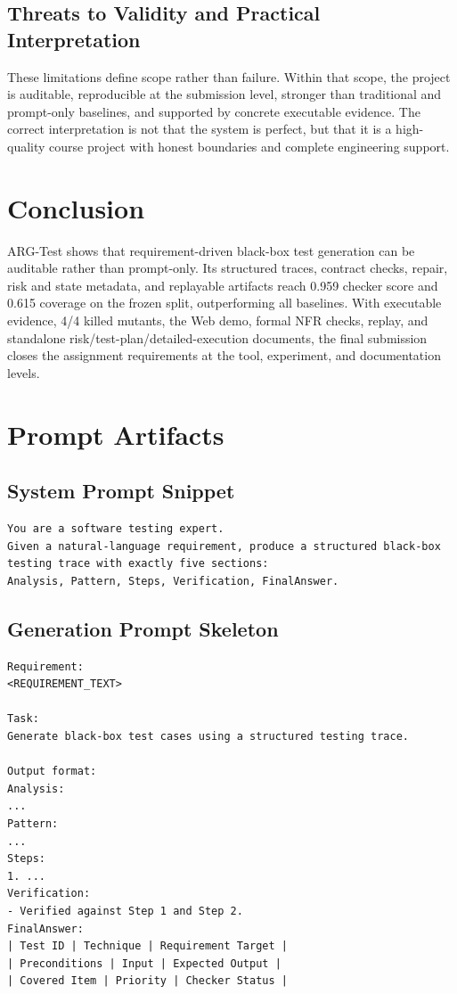 \documentclass{article}
\begin{document}
\newpage
\subsection{Threats to Validity and Practical Interpretation}
These limitations define scope rather than failure. Within that scope, the project is auditable, reproducible at the submission level, stronger than traditional and prompt-only baselines, and supported by concrete executable evidence. The correct interpretation is not that the system is perfect, but that it is a high-quality course project with honest boundaries and complete engineering support.

\section{Conclusion}
ARG-Test shows that requirement-driven black-box test generation can be auditable rather than prompt-only. Its structured traces, contract checks, repair, risk and state metadata, and replayable artifacts reach 0.959 checker score and 0.615 coverage on the frozen split, outperforming all baselines. With executable evidence, 4/4 killed mutants, the Web demo, formal NFR checks, replay, and standalone risk/test-plan/detailed-execution documents, the final submission closes the assignment requirements at the tool, experiment, and documentation levels.

\clearpage
\onecolumn
\appendix
\section{Prompt Artifacts}
\subsection{System Prompt Snippet}
\begin{verbatim}
You are a software testing expert.
Given a natural-language requirement, produce a structured black-box
testing trace with exactly five sections:
Analysis, Pattern, Steps, Verification, FinalAnswer.
\end{verbatim}

\subsection{Generation Prompt Skeleton}
\begin{verbatim}
Requirement:
<REQUIREMENT_TEXT>

Task:
Generate black-box test cases using a structured testing trace.

Output format:
Analysis:
...
Pattern:
...
Steps:
1. ...
Verification:
- Verified against Step 1 and Step 2.
FinalAnswer:
| Test ID | Technique | Requirement Target |
| Preconditions | Input | Expected Output |
| Covered Item | Priority | Checker Status |
\end{verbatim}
\end{document}
